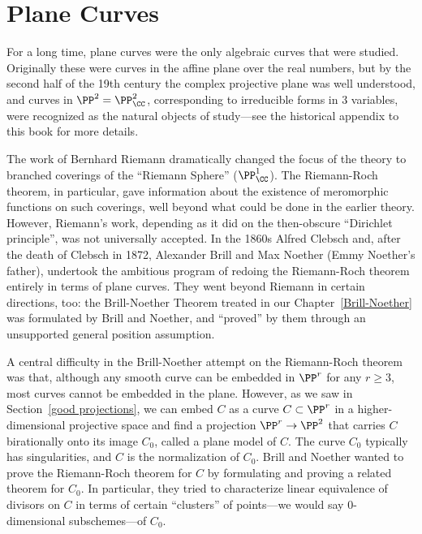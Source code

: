 

\def\adj{{\rm adj}}
\chapter{Plane Curves}
\label{PlaneCurvesChapter}


For a long time, plane curves were the only algebraic curves that were studied. Originally these were curves in the affine plane over the real numbers, but by the second half of the 19th century the complex projective plane was well understood, and curves in $\PP^2 = \PP^2_\CC$, corresponding to irreducible forms in 3 variables, were recognized as the natural objects of study---see the historical appendix to this book for more details.

The work of Bernhard Riemann dramatically changed the focus of the theory to branched coverings of   the ``Riemann Sphere'' ($\PP^1_\CC$). The Riemann-Roch theorem, in particular, gave information about the existence of meromorphic functions on such coverings, well beyond what could be done in the earlier theory. However, Riemann's work, depending as it did on the then-obscure ``Dirichlet principle'', was not universally accepted. In the 1860s Alfred Clebsch and, after the death of Clebsch  in 1872, Alexander Brill and Max Noether (Emmy Noether's father), undertook the ambitious program of redoing the Riemann-Roch theorem entirely in terms of plane curves. They went beyond Riemann in certain directions, too: the Brill-Noether Theorem treated in our Chapter~\ref{Brill-Noether} was formulated by Brill and Noether, and ``proved'' by them through an unsupported general position assumption. 


A central difficulty in the Brill-Noether attempt on the Riemann-Roch theorem was that,
although any smooth curve can be embedded in $\PP^r$ for any $r \geq 3$, most curves cannot be embedded in the plane. 
However, as we saw in Section~\ref{good projections}, we can embed $C$ as a curve $ C \subset \PP^r$ in a higher-dimensional projective space and find a projection $\PP^r \to \PP^2$ that carries $C$ birationally onto its image $C_0$, called a plane model of $C$. The curve $C_0$ typically has singularities, and $C$ is the normalization of $C_0$. Brill and Noether wanted to prove the Riemann-Roch theorem for $C$ by formulating and proving a related theorem for $C_0$. In particular, they tried to characterize linear equivalence of divisors on $C$ in terms of certain ``clusters'' of points---we would say 0-dimensional subschemes---of $C_0$. 

